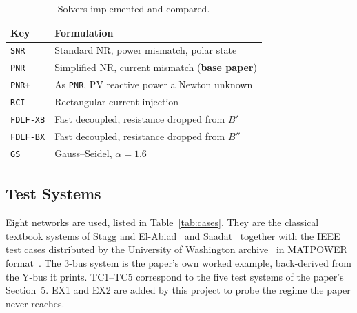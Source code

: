 \documentclass[sigconf,nonacm]{acmart}
\begin{document}
\begin{table}[t]
\centering
\caption{Solvers implemented and compared.}
\label{tab:solver-keys}
\small
\begin{tabular}{l l}
\toprule
Key & Formulation \\
\midrule
\texttt{SNR}      & Standard NR, power mismatch, polar state \\
\texttt{PNR}      & Simplified NR, current mismatch (\textbf{base paper}) \\
\texttt{PNR+}     & As \texttt{PNR}, PV reactive power a Newton unknown \\
\texttt{RCI}      & Rectangular current injection \\
\texttt{FDLF-XB}  & Fast decoupled, resistance dropped from $B'$ \\
\texttt{FDLF-BX}  & Fast decoupled, resistance dropped from $B''$ \\
\texttt{GS}       & Gauss--Seidel, $\alpha = 1.6$ \\
\bottomrule
\end{tabular}
\end{table}

\subsection{Test Systems}
Eight networks are used, listed in Table~\ref{tab:cases}. They are the
classical textbook systems of Stagg and El-Abiad~\cite{stagg1968} and
Saadat~\cite{saadat1999} together with the IEEE test cases distributed by the
University of Washington archive~\cite{uwarchive} in MATPOWER
format~\cite{matpower}. The 3-bus system is
the paper's own worked example, back-derived from the Y-bus it prints. TC1--TC5
correspond to the five test systems of the paper's Section~5. EX1 and EX2 are
added by this project to probe the regime the paper never reaches.
\end{document}
